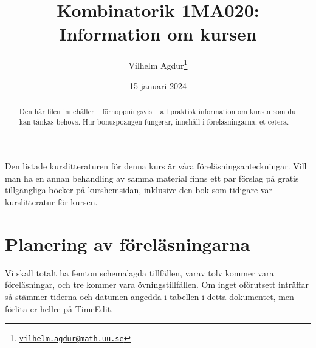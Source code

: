 \documentclass[nobib]{tufte-handout}
\title{Kombinatorik 1MA020: Information om kursen}
\author[Vilhelm Agdur]{Vilhelm Agdur\thanks{\href{mailto:vilhelm.agdur@math.uu.se}{\nolinkurl{vilhelm.agdur@math.uu.se}}}}
\date{15 januari 2024}
\begin{document}
\maketitle%

\begin{abstract}
\noindent
Den här filen innehåller -- förhoppningsvis -- all praktisk information om kursen som du kan tänkas behöva. Hur bonuspoängen fungerar, innehåll
i föreläsningarna, et cetera. 
\end{abstract}

Den listade kurslitteraturen för denna kurs är våra föreläsningsanteckningar. Vill man ha en annan behandling av samma material finns ett par förslag på gratis tillgängliga böcker på kurshemsidan, inklusive den bok som tidigare var kurslitteratur för kursen.

\section{Planering av föreläsningarna}

Vi skall totalt ha femton schemalagda tillfällen, varav tolv kommer vara föreläsningar, och tre kommer vara övningstillfällen. Om inget oförutsett inträffar så stämmer tiderna och datumen angedda i tabellen i detta dokumentet, men förlita er hellre på TimeEdit.
\end{document}
